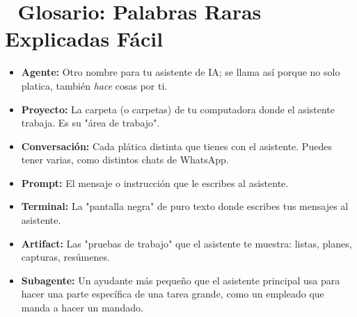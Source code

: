 \documentclass[12pt]{article}
\begin{document}
\section{📖 Glosario: Palabras Raras Explicadas Fácil}
\begin{itemize}
    \item \textbf{Agente:} Otro nombre para tu asistente de IA; se llama así porque no solo platica, también \textit{hace} cosas por ti.
    \item \textbf{Proyecto:} La carpeta (o carpetas) de tu computadora donde el asistente trabaja. Es su "área de trabajo".
    \item \textbf{Conversación:} Cada plática distinta que tienes con el asistente. Puedes tener varias, como distintos chats de WhatsApp.
    \item \textbf{Prompt:} El mensaje o instrucción que le escribes al asistente.
    \item \textbf{Terminal:} La "pantalla negra" de puro texto donde escribes tus mensajes al asistente.
    \item \textbf{Artifact:} Las "pruebas de trabajo" que el asistente te muestra: listas, planes, capturas, resúmenes.
    \item \textbf{Subagente:} Un ayudante más pequeño que el asistente principal usa para hacer una parte específica de una tarea grande, como un empleado que manda a hacer un mandado.
\end{itemize}
\end{document}
